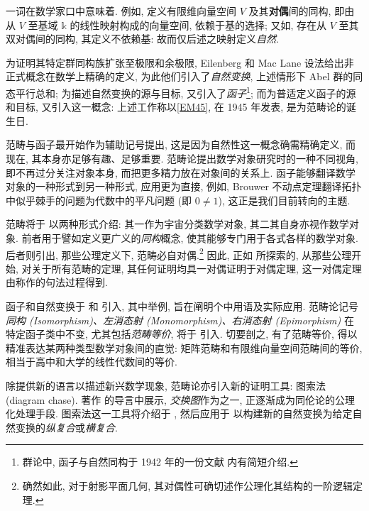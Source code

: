\par {}一词在数学家口中意味着. 例如, 定义有限维向量空间 \(V\) 及其\textbf{对偶}间的同构, 即由从 \(V\) 至基域 \(\mathbb k\) 的线性映射构成的向量空间, 依赖于基的选择; 又如, 存在从 \(V\) 至其双对偶间的同构, 其定义不依赖基: 故而仅后述之映射定义\textit{自然}.
\par 为证明其特定群同构族扩张至极限和余极限, Eilenberg 和 Mac Lane 设法给出非正式概念在数学上精确的定义, 为此他们引入了\textit{自然变换}, 上述情形下 Abel 群的同态平行总和; 为描述自然变换的源与目标, 又引入了\textit{函子}\footnote{群论中, 函子与自然同构于 1942 年的一份文献 \cite{EM42b} 内有简短介绍.}; 而为普适定义函子的源和目标, 又引入这一概念: 上述工作称以\ref{EM45}, 在 1945 年发表, 是为范畴论的诞生日.
\par 范畴与函子最开始作为辅助记号提出, 这是因为自然性这一概念确需精确定义, 而现在, 其本身亦足够有趣、足够重要. 范畴论提出数学对象研究时的一种不同视角, 即不再过分关注对象本身, 而把更多精力放在对象间的关系上. 函子能够翻译数学对象的一种形式到另一种形式, 应用更为直接, 例如, Brouwer 不动点定理翻译拓扑中似乎棘手的问题为代数中的平凡问题 (即 \(0\ne1\)), 这正是我们目前转向的主题.
\par 范畴将于  以两种形式介绍: 其一作为宇宙分类数学对象, 其二其自身亦视作数学对象. 前者用于譬如定义更广义的\textit{同构}概念, 使其能够专门用于各式各样的数学对象. 后者则引出, 那些公理定义下, 范畴必自对偶.\footnote{确然如此, 对于射影平面几何, 其对偶性可确切述作公理化其结构的一阶逻辑定理.} 因此, 正如  所探索的, 从那些公理开始, 对关于所有范畴的定理, 其任何证明均具一对偶证明于对偶定理, 这一对偶定理由称作的句法过程得到.
\par 函子和自然变换于  和  引入, 其中举例, 旨在阐明个中用语及实际应用. 范畴论记号\textit{同构 (Isomorphism)、左消态射 (Monomorphism)、右消态射 (Epimorphism)} 在特定函子类中不变, 尤其包括\textit{范畴等价}, 将于  引入. 切要剖之, 有了范畴等价, 得以精准表达某两种类型数学对象间的直觉: 矩阵范畴和有限维向量空间范畴间的等价, 相当于高中和大学的线性代数间的等价.
\par 除提供新的语言以描述新兴数学现象, 范畴论亦引入新的证明工具: 图索法 (diagram chase). 著作 \cite{ES52} 的导言中展示, \textit{交换图}作为之一, 正逐渐成为同伦论的公理化处理手段. 图索法这一工具将介绍于 , 然后应用于  以构建新的自然变换为给定自然变换的\textit{纵复合}或\textit{横复合}.

